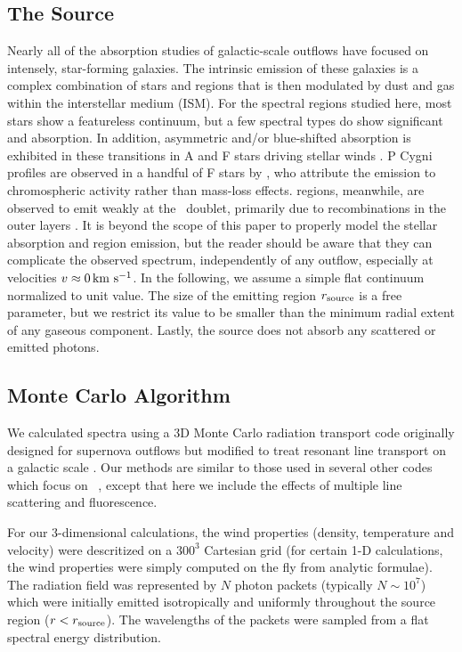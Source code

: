 \documentclass[12pt,preprint]{aastex}
\begin{document}
\subsection{The Source}

Nearly all of the absorption studies of galactic-scale outflows 
have focused on intensely, star-forming galaxies.  The
intrinsic emission of these galaxies is a complex combination of
stars and  regions that is then modulated by dust and gas
within the interstellar medium (ISM).  For the spectral regions studied
here, most stars show a featureless continuum, but a few spectral
types do show significant  and  absorption.
In addition, asymmetric and/or blue-shifted absorption is exhibited in these
transitions in A and F stars driving stellar winds \citep{sll+94}.
 P Cygni profiles are observed in a handful of F stars by \cite{sll+94}, who
attribute the emission to chromospheric activity rather than mass-loss effects.
 regions, meanwhile, are observed to emit weakly
at the \mgiid\ doublet, primarily due to recombinations in the outer
layers \citep{kbc+93}.
It is beyond the scope of this paper to
properly model the 
stellar absorption and  region emission, but the reader
should be aware that they can complicate the observed spectrum,
independently of any outflow, especially at velocities $v \approx 0 \, {\rm km~s^{-1}}$.
In the following, we assume a simple flat continuum 
normalized to unit value.  The size of the emitting
region $r_{\rm source}$ is a free parameter, but we restrict its value
to be smaller than the minimum radial extent of any gaseous
component.   Lastly, the source does not absorb any scattered or
emitted photons.


\subsection{Monte Carlo Algorithm}
\label{sec:monte}


We calculated spectra using a 3D Monte Carlo radiation transport code
originally designed for supernova outflows  \citep{Kasen_2006} but
modified to treat resonant line transport  on a galactic scale
\citep{Kasen_lyman}.  Our methods are similar to those used in several
other codes which focus on \lya\
\citep[e.g.,][]{Zheng_2002,Dijkstra_2006,Verhame_2006,Laursen_2009},
except that here we include the effects of multiple line scattering
and fluorescence. 

For our 3-dimensional calculations, the  wind properties (density, temperature and velocity) were descritized on a $300^3$ Cartesian grid (for certain 1-D calculations, the wind properties were simply computed on the fly from analytic formulae).   
The radiation field was represented by $N$ photon packets (typically $N \sim 10^7$) which were initially emitted isotropically and uniformly throughout the source region ($r < r_{\rm source}$).  The wavelengths of the packets were sampled from a flat spectral energy distribution. 
\end{document}
